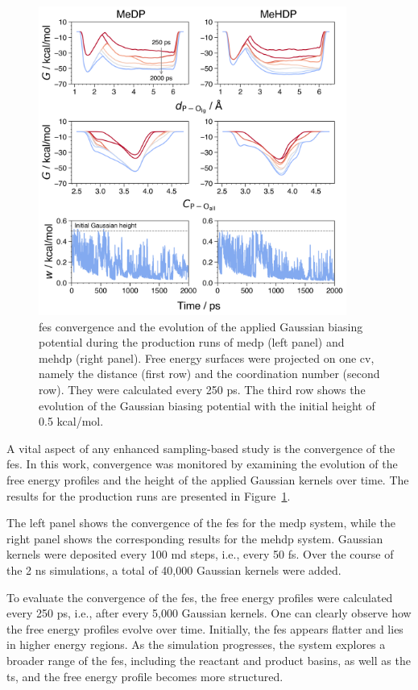 \begin{figure}[t!]
    \centering
    \includegraphics[width=0.9\textwidth]{Figures/4_Results/results_300K_fes_convergence.png}
    \caption{\ac{fes} convergence and the evolution of the applied Gaussian biasing potential during the production runs of \ac{medp} (left panel) and \ac{mehdp} (right panel). Free energy surfaces were projected on one \ac{cv}, namely the distance (first row) and the coordination number (second row). They were calculated every 250 ps. The third row shows the evolution of the Gaussian biasing potential with the initial height of 0.5 kcal/mol.}
    \label{fig:300k_fes_convergence}
\end{figure}

A vital aspect of any enhanced sampling-based study is the convergence of the \ac{fes}. In this work, convergence was monitored by examining the evolution of the free energy profiles and the height of the applied Gaussian kernels over time. The results for the production runs are presented in Figure~\ref{fig:300k_fes_convergence}.

The left panel shows the convergence of the \ac{fes} for the \ac{medp} system, while the right panel shows the corresponding results for the \ac{mehdp} system. Gaussian kernels were deposited every 100 \ac{md} steps, i.e., every 50 fs. Over the course of the 2 ns simulations, a total of 40,000 Gaussian kernels were added.

To evaluate the convergence of the \ac{fes}, the free energy profiles were calculated every 250 ps, i.e., after every 5,000 Gaussian kernels. One can clearly observe how the free energy profiles evolve over time. Initially, the \ac{fes} appears flatter and lies in higher energy regions. As the simulation progresses, the system explores a broader range of the \ac{fes}, including the reactant and product basins, as well as the \ac{ts}, and the free energy profile becomes more structured.

